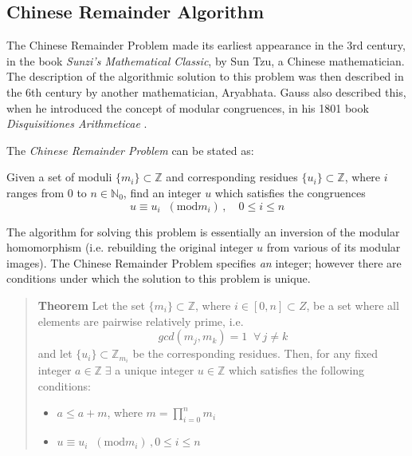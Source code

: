 \documentclass[letterpaper,12pt,titlepage,oneside,final]{book}
\newenvironment{theorem}{\begin{quote}%
  \textbf{Theorem }%
  \quad
}{%
\end{quote}%
}
\begin{document}
\subsection{Chinese Remainder Algorithm} 

The Chinese Remainder Problem made its earliest appearance in the 3rd century, in the book \textit{Sunzi's Mathematical Classic}, by Sun Tzu, a Chinese mathematician.  The description of the algorithmic solution to this problem was then described in the 6th century by another mathematician, Aryabhata.  Gauss also described this, when he introduced the concept of modular congruences, in his 1801 book \textit{Disquisitiones Arithmeticae} \cite{Geddes}.  

\noindent The \textit{Chinese Remainder Problem} can be stated as: 
\begin{addmargin}[2em]{2em}%
  Given a set of moduli ${\{m_i\} \subset \mathbb{Z}}$ and corresponding residues ${\{u_i\} \subset \mathbb{Z}}$, where ${i}$ ranges from 0 to ${n \in \mathbb{N}_0}$, find an integer ${u}$ which satisfies the congruences
  \begin{equation*}
    u \equiv u_i \;\; (\textrm{mod} m_i)\, ,  \quad 0 \leq i \leq n
  \end{equation*} 
\end{addmargin}

The algorithm for solving this problem is essentially an inversion of the modular homomorphism (i.e. rebuilding the original integer ${u}$ from various of its modular images).  The Chinese Remainder Problem specifies \textit{an} integer; however there are conditions under which the solution to this problem is unique.   

\begin{theorem}\label{Chinese Remainder Theorem}
  Let the set ${\{m_i\} \subset \mathbb{Z}}$, where ${i \in [0, n] \subset Z}$, be a set where all elements are pairwise relatively prime, i.e.
  \begin{equation*}
    gcd( m_j, m_k) = 1 \;\; \forall \, j \neq k
  \end{equation*}
  and let ${\{u_i\} \subset \mathbb{Z}_{m_i}}$ be the corresponding residues.  Then, for any fixed integer ${a \in \mathbb{Z} \; \exists}$ a unique integer ${u \in \mathbb{Z}}$ which satisfies the following conditions:
  \begin{itemize}
    \item ${a \leq a + m}$, where ${m = \prod_{i=0}^{n}m_i}$
    \item ${u \equiv u_i \;\; (\textrm{mod} m_i)\,, 0 \leq i \leq n}$
  \end{itemize}  
\end{theorem}
\end{document}

